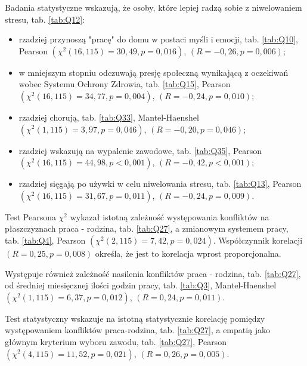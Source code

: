 \documentclass[a4paper,12pt,twoside,openright]{mwrep}
\begin{document}

Badania statystyczne wskazują, że osoby, które lepiej radzą sobie z niwelowaniem stresu, tab. \ref{tab:Q12}:
	\begin{itemize}
		\item rzadziej przynoszą "pracę" do domu w postaci myśli i emocji, tab. \ref{tab:Q10}, Pearson $(\chi^2 (16, 115) = 30,49, p = 0,016)$,  $(R = -0,26, p = 0,006)$;
		\item w mniejszym stopniu odczuwają presję społeczną wynikającą z oczekiwań wobec Systemu Ochrony Zdrowia, tab. \ref{tab:Q15},  Pearson $(\chi^2 (16, 115) = 34,77, p = 0,004)$, $(R = -0,24, p = 0,010)$;
		\item rzadziej chorują, tab. \ref{tab:Q33}, Mantel-Haenshel $(\chi^2 (1, 115) = 3,97, p = 0,046)$, $(R = -0,20, p = 0,046)$;
		\item rzadziej wskazują na wypalenie zawodowe, tab. \ref{tab:Q35}, Pearson $(\chi^2 (16, 115) = 44,98, p < 0,001)$, $(R = -0,42, p < 0,001)$;
		\item rzadziej sięgają po używki w celu niwelowania stresu, tab. \ref{tab:Q13}, Pearson $(\chi^2 (16, 115) = 31,67, p = 0,011)$, $(R = -0,24, p = 0,009)$.
	\end{itemize}
	



	
	Test Pearsona $\chi^2$ wykazał istotną zależność występowania konfliktów na płaszczyznach praca - rodzina, tab. \ref{tab:Q27}, a zmianowym systemem pracy, tab. \ref{tab:Q4}, Pearson $(\chi^2 (2, 115) = 7,42, p = 0,024)$. Współczynnik korelacji $(R = 0,25, p = 0,008)$ określa, że jest to korelacja wprost proporcjonalna.
	

	Występuje również zależność nasilenia konfliktów praca - rodzina, tab. \ref{tab:Q27}, od średniej miesięcznej ilości godzin pracy, tab. \ref{tab:Q3}, 
Mantel-Haenshel $(\chi^2 (1, 115) = 6,37, p=0,012)$, $(R = 0,24, p = 0,011)$.

	Test statystyczny wskazuje na istotną statystycznie korelację pomiędzy występowaniem konfliktów praca-rodzina, tab. \ref{tab:Q27}, a empatią jako głównym kryterium wyboru zawodu, tab. \ref{tab:Q27}, Pearson $(\chi^2 (4, 115) = 11,52, p=0,021)$, $(R = 0,26, p = 0,005)$.
\end{document}
